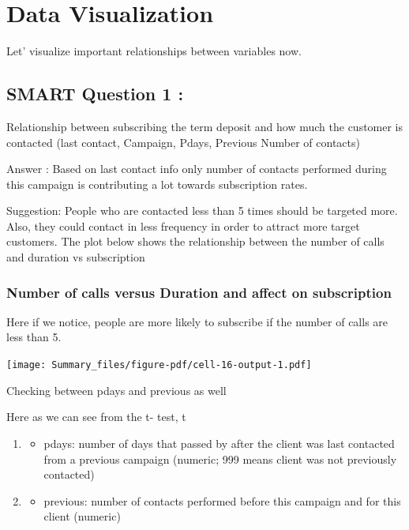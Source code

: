 \documentclass[
  letterpaper,
  DIV=11,
  numbers=noendperiod]{scrartcl}
\providecommand{\tightlist}{%
  \setlength{\itemsep}{0pt}\setlength{\parskip}{0pt}}\usepackage{longtable,booktabs,array}
\begin{document}
\hypertarget{data-visualization}{%
\section{Data Visualization}\label{data-visualization}}

Let' visualize important relationships between variables now.

\hypertarget{smart-question-1}{%
\subsection{SMART Question 1 :}\label{smart-question-1}}

Relationship between subscribing the term deposit and how much the
customer is contacted (last contact, Campaign, Pdays, Previous Number of
contacts)

Answer : Based on last contact info only number of contacts performed
during this campaign is contributing a lot towards subscription rates.

Suggestion: People who are contacted less than 5 times should be
targeted more. Also, they could contact in less frequency in order to
attract more target customers. The plot below shows the relationship
between the number of calls and duration vs subscription

\hypertarget{number-of-calls-versus-duration-and-affect-on-subscription}{%
\subsubsection{Number of calls versus Duration and affect on
subscription}\label{number-of-calls-versus-duration-and-affect-on-subscription}}

Here if we notice, people are more likely to subscribe if the number of
calls are less than 5.

\texttt{[image: Summary\_files/figure-pdf/cell-16-output-1.pdf]}

Checking between pdays and previous as well

Here as we can see from the t- test, t

\begin{enumerate}
\def\labelenumi{\arabic{enumi}.}
\setcounter{enumi}{12}
\item
  \begin{itemize}
  \tightlist
  \item
    pdays: number of days that passed by after the client was last
    contacted from a previous campaign (numeric; 999 means client was
    not previously contacted)
  \end{itemize}
\item
  \begin{itemize}
  \tightlist
  \item
    previous: number of contacts performed before this campaign and for
    this client (numeric)
  \end{itemize}
\end{enumerate}
\end{document}
